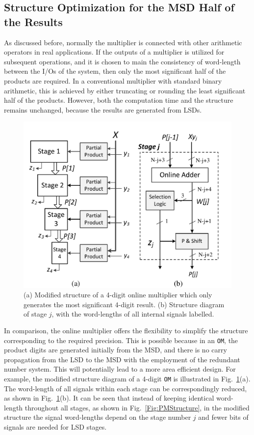 \documentclass[conference]{IEEEtran}
\begin{document}
\subsection{Structure Optimization for the MSD Half of the Results}
As discussed before, normally the multiplier is connected with other arithmetic operators in real applications. If the outputs of a multiplier is utilized for subsequent operations, and it is chosen to main the consistency of word-length between the I/Os of the system, then only the most significant half of the products are required. In a conventional multiplier with standard binary arithmetic, this is achieved by either truncating or rounding the least significant half of the products. However, both the computation time and the structure remains unchanged, because the results are generated from LSDs.

\begin{figure}[tbp]
	\centering
	\includegraphics[width=.5\textwidth]{./Figures/ParallelMult_MSDhalf.pdf}
	\caption{(a) Modified structure of a 4-digit online multiplier which only generates the most significant 4-digit result. (b) Structure diagram of stage $j$, with the word-lengths of all internal signals labelled.}
	\label{Fig:PMStructure_MSDhalf}
\end{figure}

In comparison, the online multiplier offers the flexibility to simplify the structure corresponding to the required precision. This is possible because in an \texttt{OM}, the product digits are generated initially from the MSD, and there is no carry propagation from the LSD to the MSD with the employment of the redundant number system. This will potentially lead to a more area efficient design. For example, the modified structure diagram of a 4-digit \texttt{OM} is illustrated in Fig.~\ref{Fig:PMStructure_MSDhalf}(a). The word-length of all signals within each stage can be correspondingly reduced, as shown in Fig.~\ref{Fig:PMStructure_MSDhalf}(b). It can be seen that instead of keeping identical word-length throughout all stages, as shown in Fig.~\ref{Fig:PMStructure}, in the modified structure the signal word-lengths depend on the stage number $j$ and fewer bits of signals are needed for LSD stages.
\end{document}
